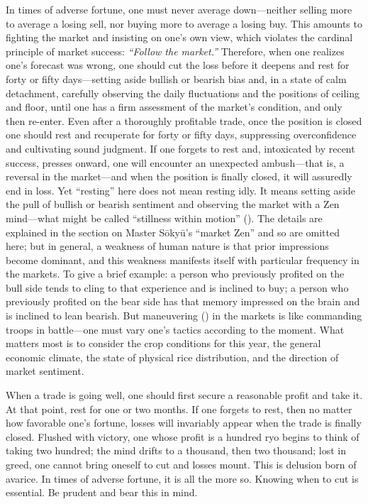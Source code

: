 \commentary
In times of adverse fortune, one must never average down---neither
selling more to average a losing sell, nor buying more to average a
losing buy. This amounts to fighting the market and insisting on
one's own view, which violates the cardinal principle of market
success: \textit{``Follow the market.''} Therefore, when one realizes one's
forecast was wrong, one should cut the loss before it deepens and
rest for forty or fifty days---setting aside bullish or bearish
bias and, in a state of calm detachment, carefully observing the
daily fluctuations and the positions of ceiling and floor, until
one has a firm assessment of the market's condition, and only then
re-enter. Even after a thoroughly profitable trade, once the
position is closed one should rest and recuperate for forty or
fifty days, suppressing overconfidence and cultivating sound
judgment. If one forgets to rest and, intoxicated by recent
success, presses onward, one will encounter an unexpected ambush---that is, a reversal in the market---and when the position is
finally closed, it will assuredly end in loss. Yet ``resting'' here
does not mean resting idly. It means setting aside the pull of
bullish or bearish sentiment and observing the market with a Zen
mind---what might be called ``stillness within motion''
(). The details are explained in the section on
Master S\=oky\=u's ``market Zen'' and so are omitted here; but in
general, a weakness of human nature is that prior impressions
become dominant, and this weakness manifests itself with particular
frequency in the markets. To give a brief example: a person who
previously profited on the bull side tends to cling to that
experience and is inclined to buy; a person who previously profited
on the bear side has that memory impressed on the brain and is
inclined to lean bearish. But maneuvering () in
the markets is like commanding troops in battle---one must vary
one's tactics according to the moment. What matters most is to
consider the crop conditions for this year, the general economic
climate, the state of physical rice distribution, and the direction
of market sentiment.


\begin{sokyubox}
{\small\itshape\color{sokyubar} }

\medskip
When a trade is going well, one should first secure a reasonable
profit and take it. At that point, rest for one or two months. If
one forgets to rest, then no matter how favorable one's fortune,
losses will invariably appear when the trade is finally closed.
Flushed with victory, one whose profit is a hundred ryo begins to
think of taking two hundred; the mind drifts to a thousand, then
two thousand; lost in greed, one cannot bring oneself to cut and
losses mount. This is delusion born of avarice. In times of
adverse fortune, it is all the more so. Knowing when to cut is
essential. Be prudent and bear this in mind.
\end{sokyubox}

